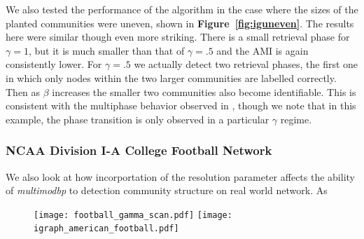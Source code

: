 \documentclass[11pt]{article}
\begin{document}
We also tested the performance of the algorithm in the case where the sizes of the planted communities were uneven, shown in \textbf{Figure~\ref{fig:iguneven}}.  The results here were similar though even more striking.  There is a small retrieval phase for $\gamma=1$, but it is much smaller than that of $\gamma=.5$ and the AMI is again consistently lower.  For $\gamma=.5$ we actually detect two retrieval phases, the first one in which only nodes within the two larger communities are labelled correctly.  Then as $\beta$ increases the smaller two communities also become identifiable.  This is consistent with the multiphase behavior observed in \cite{Schulke:2015hq}, though we note that in this example, the phase transition is only observed in a particular $\gamma$ regime.

\subsubsection{ NCAA Division I-A College Football Network }
 
 We also look at how incorportation of the resolution parameter affects the ability of \textit{multimodbp} to detection community structure on real world network.  As     
 \begin{figure}[htbp]
\begin{center}
	\begin{mdframed}
		\texttt{[image: football\_gamma\_scan.pdf]}
		\texttt{[image: igraph\_american\_football.pdf]}
	\end{mdframed}
\caption{ \label{fig:footballgamma}}
\end{center}
\end{figure}   
\end{document}
